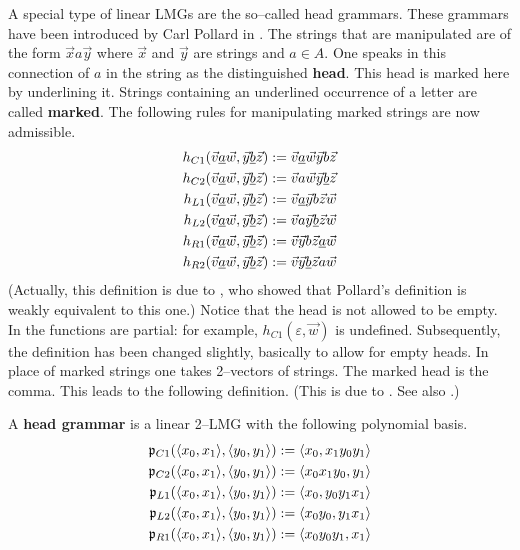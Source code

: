 A special type of linear LMGs are the so--called head grammars.
These grammars have been introduced by Carl Pollard
in . The strings that are manipulated are
of the form $\vec{x}a\vec{y}$ where $\vec{x}$ and $\vec{y}$
are strings and $a \in A$. One speaks in this connection of
$a$ in the string as the distinguished \textbf{head}.
This head is marked here by underlining it. Strings containing
an underlined occurrence of a letter are called \textbf{marked}.
The following rules for manipulating marked strings are now
admissible. 
\begin{equation}
\begin{split}
h_{C1}(\vec{v}\underline{a}\vec{w}, \vec{y}\underline{b}\vec{z}) &
    := \vec{v}\underline{a}\vec{w}\vec{y}b\vec{z} \\
h_{C2}(\vec{v}\underline{a}\vec{w}, \vec{y}\underline{b}\vec{z}) &
    := \vec{v}a\vec{w}\vec{y}\underline{b}\vec{z} \\
h_{L1}(\vec{v}\underline{a}\vec{w}, \vec{y}\underline{b}\vec{z}) &
    := \vec{v}\underline{a}\vec{y}b\vec{z}\vec{w} \\
h_{L2}(\vec{v}\underline{a}\vec{w}, \vec{y}\underline{b}\vec{z}) &
    := \vec{v}a\vec{y}\underline{b}\vec{z}\vec{w} \\
h_{R1}(\vec{v}\underline{a}\vec{w}, \vec{y}\underline{b}\vec{z}) &
    := \vec{v}\vec{y}b\vec{z}\underline{a}\vec{w} \\
h_{R2}(\vec{v}\underline{a}\vec{w}, \vec{y}\underline{b}\vec{z}) &
    := \vec{v}\vec{y}\underline{b}\vec{z}a\vec{w}
\end{split}
\end{equation}
(Actually, this definition is due to \cite{roach:87}, 
who showed that Pollard's definition is weakly equivalent to this 
one.) Notice that the head is not allowed to be empty. In 
\cite{pollard:head} the functions are partial: for example, 
$h_{C1}(\varepsilon, \vec{w})$ is undefined. Subsequently, the 
definition has been changed slightly, basically to allow for empty 
heads. In place of marked strings one takes 2--vectors of strings. 
The marked head is the comma. This leads to the following definition. 
(This is due to \cite{shanker-weir-joshi:coling86}. 
See also \cite{seki}.)
\begin{defn}
A \textbf{head grammar} is a linear 2--LMG with the following
polynomial basis.
\begin{equation}
\begin{split}
\mathfrak{p}_{C1}(\langle x_0,x_1\rangle,\langle y_0,y_1\rangle) &
    := \langle x_0, x_1y_0y_1\rangle \\
\mathfrak{p}_{C2}(\langle x_0,x_1\rangle,\langle y_0,y_1\rangle) &
    := \langle x_0x_1y_0, y_1\rangle \\
\mathfrak{p}_{L1}(\langle x_0,x_1\rangle,\langle y_0,y_1\rangle) &
    := \langle x_0, y_0y_1x_1\rangle \\
\mathfrak{p}_{L2}(\langle x_0,x_1\rangle,\langle y_0,y_1\rangle) &
    := \langle x_0y_0, y_1x_1\rangle \\
\mathfrak{p}_{R1}(\langle x_0,x_1\rangle,\langle y_0,y_1\rangle) &
    := \langle x_0y_0y_1, x_1\rangle 
\end{split}
\end{equation}
\end{defn}
